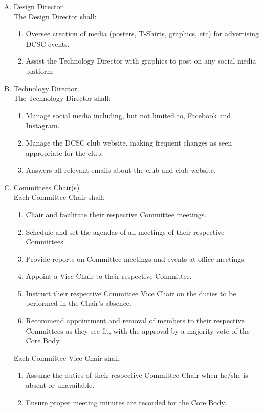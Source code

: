 \documentclass{article}
\newenvironment{li}{
\begin{enumerate}
  \setlength{\itemsep}{1pt}
  \setlength{\parskip}{0pt}
  \setlength{\parsep}{0pt}
}{\end{enumerate}}
\begin{document}
\begin{enumerate}[A.]
\item Design Director \\
	The Design Director shall:
	\begin{li}
	\item Oversee creation of media (posters, T-Shirts, graphics, etc) for advertising DCSC events.
	\item Assist the Technology Director with graphics to post on any social media platform
	\end{li}
	
\item Technology Director \\
	The Technology Director shall:
	\begin{li}
	\item Manage social media including, but not limited to, Facebook and Instagram.
	\item Manage the DCSC club website, making frequent changes as seen appropriate for the club. 
	\item Answers all relevant emails about the club and club website. 
	\end{li}
	

\item Committees Chair(s) \\
	Each Committee Chair shall:
	\begin{li}
	\item Chair and facilitate their respective Committee meetings.
	\item Schedule and set the agendas of all meetings of their respective Committees.
	\item Provide reports on Committee meetings and events at office meetings.
	\item Appoint a Vice Chair to their respective Committee.
	\item Instruct their respective Committee Vice Chair on the duties to be performed in the Chair's absence.
	\item Recommend appointment and removal of members to their respective Committees as they see fit, with the approval by a majority vote of the Core Body.
	\end{li}

\noindent Each Committee Vice Chair shall:
\begin{li}
\item Assume the duties of their respective Committee Chair when he/she is absent or unavailable. 
\item Ensure proper meeting minutes are recorded for the Core Body.
\end{li}

\end{enumerate}
\end{document}
